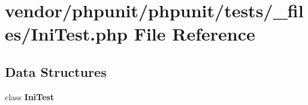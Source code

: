 \section{vendor/phpunit/phpunit/tests/\+\_\+files/\+Ini\+Test.php File Reference}
\label{_ini_test_8php}
\subsection*{Data Structures}
\begin{DoxyCompactItemize}
\item 
class {\bf Ini\+Test}
\end{DoxyCompactItemize}
